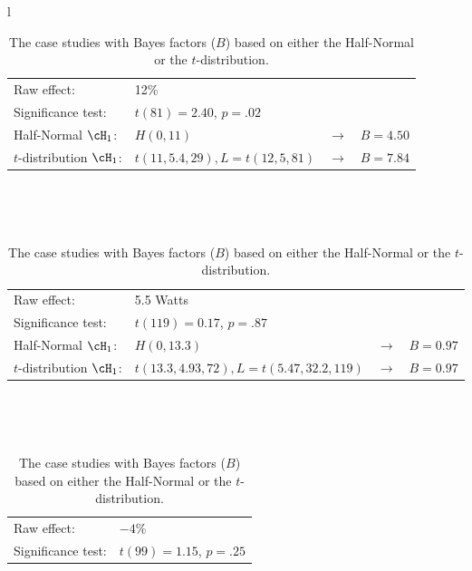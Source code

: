 \begin{table}\centering
\caption{The case studies with Bayes factors ($B$) based on either the Half-Normal or the $t$-distribution.}
\label{tab:zd1:1}
 \begin{tabular}{l} 
  \\\hline
  \begin{tabular}{p{1.5in}p{2.75in}p{.2in}p{.75in}}
    Raw effect:               & \multicolumn{3}{l}{12\%}                                                     \\ 
    Significance test:        & \multicolumn{3}{l}{$t(81) = 2.40$, $p = .02$}                                \\
    Half-Normal $\cH_1$:      & $H(0, 11)$                                     & $\rightarrow$ & $B = 4.50$  \\
    $t$-distribution $\cH_1$: & $t(11, 5.4, 29), L = t(12, 5, 81)$             & $\rightarrow$ & $B = 7.84$
  \end{tabular}                                                                                        \\\hline
  \rule{0pt}{1.5\normalbaselineskip}                                                 \\\hline
  \begin{tabular}{p{1.5in}p{2.75in}p{.2in}p{.75in}}
    Raw effect:               & \multicolumn{3}{l}{5.5 Watts}                                                \\ 
    Significance test:        & \multicolumn{3}{l}{$t(119) = 0.17$, $p = .87$}                               \\
    Half-Normal $\cH_1$:      & $H(0, 13.3)$                                   & $\rightarrow$ & $B = 0.97$  \\
    $t$-distribution $\cH_1$: & $t(13.3, 4.93, 72), L = t(5.47, 32.2, 119)$    & $\rightarrow$ & $B = 0.97$
  \end{tabular}                                                                                        \\\hline
  \rule{0pt}{1.5\normalbaselineskip}                                                   \\\hline
  \begin{tabular}{p{1.5in}p{2.75in}p{.2in}p{.75in}}
    Raw effect:               & \multicolumn{3}{l}{$-4\%$}                                                   \\ 
    Significance test:        & \multicolumn{3}{l}{ $t(99) = 1.15$, $p = .25$ }                              \\

\end{tabular}
\end{tabular}
\end{table}
